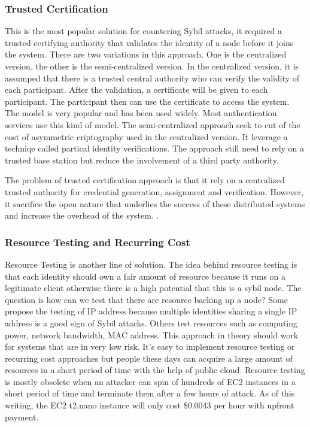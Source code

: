 \documentclass[conference]{IEEEtran}
\begin{document}
\subsubsection{Trusted Certification}
This is the most popular solution for countering Sybil attacks, it required a trusted certifying authority that validates the identity of a node before it joins the system. There are two variations in this approach. One is the centralized version, the other is the semi-centralized version. In the centralized version, it is assumped that there is a trusted central authority who can verify the validity of each participant. After the validation, a certificate will be given to each participant. The participant then can use the certificate to access the system. The model is very popular and has been used widely. Most authentication services use this kind of model. The semi-centralized approach seek to cut of the cost of asymmetric criptography used in the centralized version. It leverage a techniqe called partical identity verifications. The approach still need to rely on a trusted base station but reduce the involvement of a third party authority.

The problem of  trusted certification approach is that it rely on a centralized trusted authority for credential generation, assignment and verification. 
However, it sacrifice the open nature that underlies the success of these distributed systems and increase the overhead of the system. 
\cite{newsome04sybil}\cite{Castro02Secure}\cite{Adya02FFA}.

\subsubsection{Resource Testing and Recurring Cost}
Resource Testing is another line of solution. The idea behind resource testing is that each identity should own a fair amount of resource because it runs on a 
legitimate client otherwise there is a high potential that this is a sybil node. The question is how can we test that there are resource backing up a node? 
Some propose the testing of IP address because multiple identities sharing a single IP address is a good sign of Sybil attacks. 
Others test resources such as computing power, network bandwidth, MAC address. This approach in theory should work for systems that are in very low risk. 
It’s easy to implement resource testing or recurring cost approaches but people these days can acquire a large amount of resources in a short period of time with the help of public cloud.
Resource testing is mostly obsolete when an attacker can spin of hundreds of EC2 instances in a short period of time and terminate them after a few hours of attack. 
As of this writing, the EC2 t2.nano instance will only cost \$0.0043 per hour with upfront payment.
\end{document}
